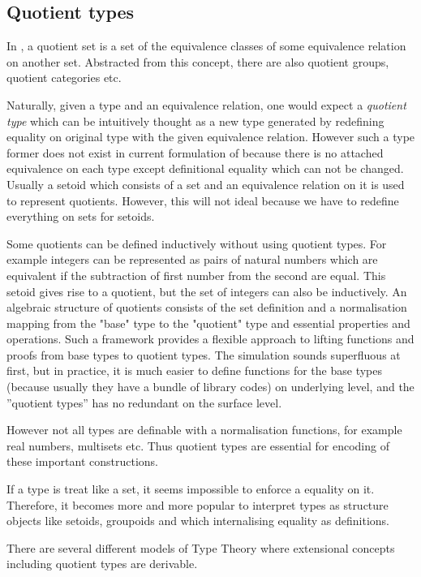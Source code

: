 \subsection{Quotient types}

In \maths, a quotient set is a set of the equivalence classes of
some equivalence relation on another set. Abstracted from this
concept, there are also quotient groups, quotient categories etc.

Naturally, given a type and an equivalence relation, one would expect a \emph{quotient type}
which can be intuitively thought as a new type generated by redefining equality on original type with the given equivalence relation.
However such a type former does not exist in current formulation of \itt because there is no attached equivalence on each type except definitional equality which can not be changed. Usually a setoid which consists of a set and an equivalence relation on it is used to represent quotients. However, this will not ideal because we have to redefine everything on sets for setoids.

Some quotients can be defined inductively without using quotient types. 
For example integers can be represented as pairs of natural numbers which are equivalent if the subtraction of first number from the second are equal.  This setoid gives rise to a quotient, but the set of integers can also be inductively. An algebraic structure of quotients consists of the set definition and a normalisation mapping from the "base" type to the "quotient" type and essential properties and operations. Such a framework provides a flexible approach to lifting functions and proofs from base types to quotient types. The simulation sounds superfluous at first, but in practice, it is much easier to define
functions for the base types (because usually they have a bundle of
library codes) on underlying level, and the ''quotient types'' has no
redundant on the surface level.

However not all types are definable with a normalisation functions, for example real numbers, multisets etc. Thus quotient types are essential for encoding of these important constructions.

If a type is treat like a set, it seems impossible to enforce a equality on it. Therefore, it becomes more and more popular to interpret types as structure objects like setoids, groupoids and \wog which internalising equality as definitions. 

There are several different models of Type Theory where extensional concepts including quotient types are derivable.

